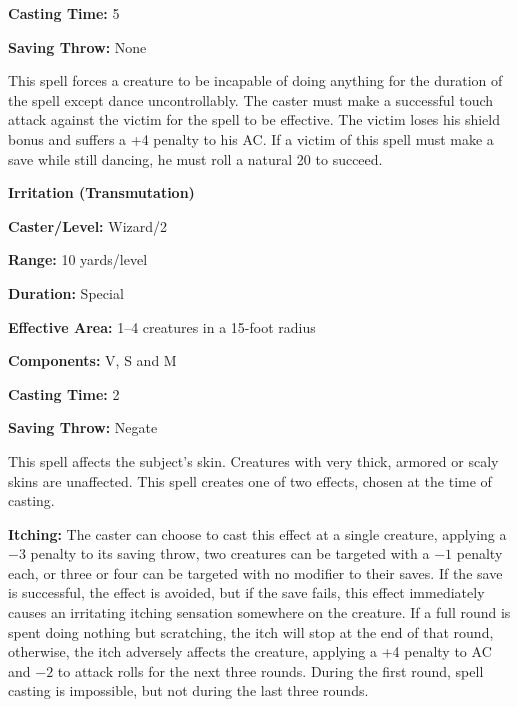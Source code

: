 \begin{multicols}{2}
\begin{minipage}{\columnwidth}
\noindent \textbf{Casting Time:} 5

\noindent \textbf{Saving Throw:} None

\end{minipage}

This spell forces a creature to be incapable of doing anything for the duration of the spell except dance uncontrollably.  The caster must make a successful touch attack against the victim for the spell to be effective.  The victim loses his shield bonus and suffers a +4 penalty to his AC.  If a victim of this spell must make a save while still dancing, he must roll a natural 20 to succeed.

\vspace{1em}

\noindent
\begin{minipage}{\columnwidth}

\noindent \textbf{Irritation (Transmutation)}

\noindent \textbf{Caster/Level:} Wizard/2

\noindent \textbf{Range:} 10 yards/level

\noindent \textbf{Duration:} Special

\noindent \textbf{Effective Area:} 1--4 creatures in a 15-foot radius

\noindent \textbf{Components:} V, S and M

\noindent \textbf{Casting Time:} 2

\noindent \textbf{Saving Throw:} Negate

\end{minipage}

This spell affects the subject's skin.  Creatures with very thick, armored or scaly skins are unaffected.  This spell creates one of two effects, chosen at the time of casting. 

\textbf{Itching:} The caster can choose to cast this effect at a single creature, applying a $-3$ penalty to its saving throw, two creatures can be targeted with a $-1$ penalty each, or three or four can be targeted with no modifier to their saves.  If the save is successful, the effect is avoided, but if the save fails, this effect immediately causes an irritating itching sensation somewhere on the creature. If a full round is spent doing nothing but scratching, the itch will stop at the end of that round, otherwise, the itch adversely affects the creature, applying a +4 penalty to AC and $-2$ to attack rolls for the next three rounds.    During the first round, spell casting is impossible, but not during the last three rounds.


\end{multicols}
